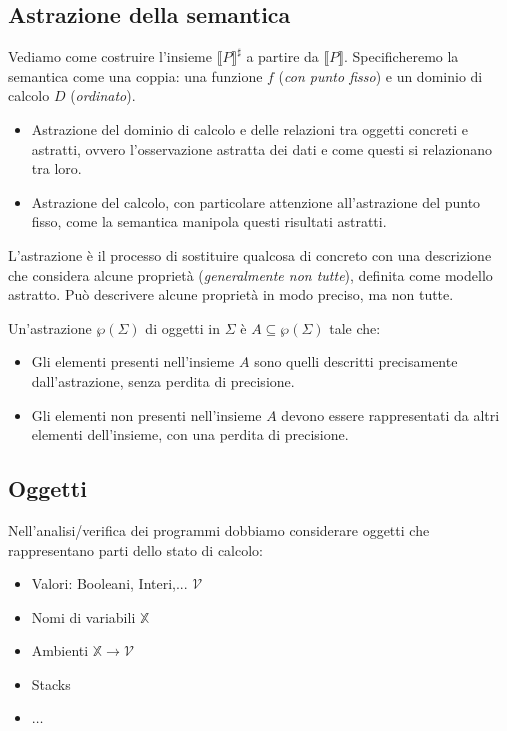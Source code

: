 \subsection{Astrazione della semantica}
Vediamo come costruire l'insieme $\llbracket P \rrbracket^\sharp$ a partire da $\llbracket P \rrbracket$.
Specificheremo la semantica come una coppia: una funzione $f$ (\textit{con punto fisso}) e un
dominio di calcolo $D$ (\textit{ordinato}).

\begin{itemize}
  \item Astrazione del dominio di calcolo e delle relazioni tra oggetti concreti e astratti, ovvero 
  l'osservazione astratta dei dati e come questi si relazionano tra loro.
  \item Astrazione del calcolo, con particolare attenzione all'astrazione del punto fisso, come la 
  semantica manipola questi risultati astratti.
\end{itemize}
L'astrazione è il processo di sostituire qualcosa di concreto con una descrizione che considera alcune proprietà
(\textit{generalmente non tutte}), definita come modello astratto.
Può descrivere alcune proprietà in modo preciso, ma non tutte.

Un'astrazione $\wp(\Sigma)$ di oggetti in $\Sigma$ è $A \subseteq \wp(\Sigma)$ tale che:
\begin{itemize}
    \item Gli elementi presenti nell'insieme $A$ sono quelli descritti precisamente
    dall'astrazione, senza perdita di precisione.
    \item Gli elementi non presenti nell'insieme $A$ devono essere rappresentati da
    altri elementi dell'insieme, con una perdita di precisione.
\end{itemize}
\subsection{Oggetti}
Nell'analisi/verifica dei programmi dobbiamo considerare oggetti che rappresentano parti dello stato di calcolo:
\begin{itemize}
    \item Valori: Booleani, Interi,... $\mathcal{V}$
    \item Nomi di variabili $\mathbb{X}$
    \item Ambienti $\mathbb{X} \rightarrow \mathcal{V}$
    \item Stacks
    \item $\ldots$
\end{itemize}

